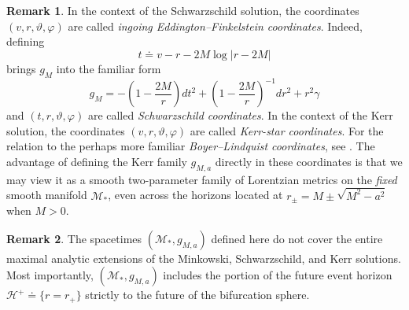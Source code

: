 \documentclass[10pt]{article}
\numberwithin{equation}{section}
\theoremstyle{plain}
\theoremstyle{definition}
\newtheorem{rk}{Remark}[section]
\begin{document}
\begin{rk}
In the context of the Schwarzschild solution, the coordinates $(v,r,\vartheta,\varphi)$ are called \emph{ingoing Eddington--Finkelstein coordinates}. Indeed, defining 
\begin{equation*}
    t\doteq v-r-2M\log|r-2M|
\end{equation*}
brings $g_M$ into the familiar form 
\begin{equation*}
    g_M= -\left(1-\frac{2M}{r}\right)dt^2+\left(1-\frac{2M}{r}\right)^{-1}dr^2+r^2\gamma
\end{equation*} and $(t,r,\vartheta,\varphi)$ are called \emph{Schwarzschild coordinates}. 
    In the context of the Kerr solution, the coordinates $(v,r,\vartheta,\varphi)$ are called \emph{Kerr-star coordinates}. For the relation to the perhaps more familiar \emph{Boyer--Lindquist coordinates}, see \cite{ONeill-book}. The advantage of defining the Kerr family $g_{M,a}$ directly in these coordinates is that we may view it as a smooth two-parameter family of Lorentzian metrics on the \emph{fixed} smooth manifold $\mathcal M_*$, even across the horizons located at $r_\pm = M\pm\sqrt{M^2-a^2}$ when $M>0$. 
\end{rk}

\begin{rk}
    The spacetimes $(\mathcal M_*,g_{M,a})$ defined here do not cover the entire maximal analytic extensions of the Minkowski, Schwarzschild, and Kerr solutions. Most importantly, $(\mathcal M_*,g_{M,a})$ includes the portion of the future event horizon $\mathcal H^+\doteq \{r=r_+\}$ strictly to the future of the bifurcation sphere. 
\end{rk}
\end{document}
